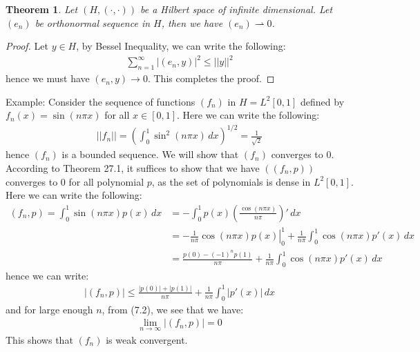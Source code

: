 \documentclass[11pt]{book}
\theoremstyle{break}
\theoremstyle{break}
\newtheorem{thm}{Theorem}[section]
\newcommand{\example}{\color{green}Example: \color{black}}
\begin{document}
\begin{thm}
Let $(H,(\cdot, \cdot))$ be a Hilbert space of infinite dimensional. Let $(e_n)$ be orthonormal sequence in $H$, then we have $(e_n) \rightharpoonup 0$. 
\end{thm}
\begin{proof}
Let $y \in H$, by Bessel Inequality, we can write the following:
\begin{align*}
\sum_{n=1}^\infty |(e_n,y)|^2 \leq ||y||^2
\end{align*}
hence we must have $(e_n, y) \to 0$. This completes the proof.
\end{proof}

\example 
Consider the sequence of functions $(f_n)$ in $H = L^2[0,1]$ defined by $f_n(x) = \sin(n\pi x)$ for all $x \in [0,1]$. Here we can write the following:
\begin{align*}
||f_n|| = \left(\int_{0}^1 \sin^2(n\pi x)\, dx\right)^{1/2} = \frac{1}{\sqrt{2}}
\end{align*}
hence $(f_n)$ is a bounded sequence. We will show that $(f_n)$ converges to $0$. According to Theorem 27.1, it suffices to show that we have $((f_n,p))$ converges to $0$ for all polynomial $p$, as the set of polynomials is dense in $L^2[0,1]$. Here we can write the following:
\begin{align*}
(f_n, p) = \int_0^1 \sin(n\pi x) p(x)\, dx &= -\int_0^1 p(x) \left( \frac{\cos(n\pi x)}{n\pi}\right)' \, dx\\
&=\left. -\frac{1}{n\pi}\cos(n\pi x) p(x) \right|_0^1 + \frac{1}{n\pi}\int_0^1 \cos(n\pi x) p'(x) \, dx \\
&= \frac{p(0)-(-1)^n p(1)}{n\pi} + \frac{1}{n\pi}\int_0^1 \cos(n\pi x) p'(x)\, dx
\end{align*}
hence we can write:
\begin{align}
|(f_n,p)| \leq \frac{|p(0)| + |p(1)|}{n\pi}+ \frac{1}{n\pi}\int_0^1 |p'(x)| \, dx
\end{align}
and for large enough $n$, from (7.2), we see that we have:
\begin{align*}
\lim_{n\to \infty }|(f_n,p)| = 0
\end{align*}
This shows that $(f_n)$ is weak convergent. \\
\end{document}
